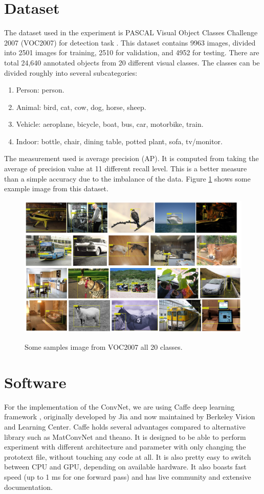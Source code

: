 \documentclass[a4paper,11pt]{kth-mag}
\begin{document}
\section{Dataset}
The dataset used in the experiment is PASCAL Visual Object Classes Challenge 2007 (VOC2007) for detection task \cite{pascal2007}. This dataset contains 9963 images, divided into 2501 images for training, 2510 for validation, and 4952 for testing. There are total 24,640 annotated objects from 20 different visual classes. The classes can be divided roughly into several subcategories:
\begin{enumerate}
\item Person: person.
\item Animal: bird, cat, cow, dog, horse, sheep.
\item Vehicle: aeroplane, bicycle, boat, bus, car, motorbike, train.
\item Indoor: bottle, chair, dining table, potted plant, sofa, tv/monitor.
\end{enumerate}

The measurement used is average precision (AP). It is computed from taking the average of precision value at 11 different recall level. This is a better measure than a simple accuracy due to the imbalance of the data. Figure \ref{fig:pascal} shows some example image from this dataset.

\begin{figure}
\centering
\includegraphics[scale=0.5]{image/pascal_samples.png}
\label{fig:pascal}
\caption{Some samples image from VOC2007 all 20 classes.}
\end{figure}

\section{Software}
For the implementation of the ConvNet, we are using Caffe deep learning framework \cite{caffe}, originally developed by Jia and now maintained by Berkeley Vision and Learning Center. Caffe holds several advantages compared to alternative library such as MatConvNet and theano. It is designed to be able to perform experiment with different architecture and parameter with only changing the prototext file, without touching any code at all. It is also pretty easy to switch between CPU and GPU, depending on available hardware. It also boasts fast speed (up to 1 ms for one forward pass) and has live community and extensive documentation.
\end{document}
